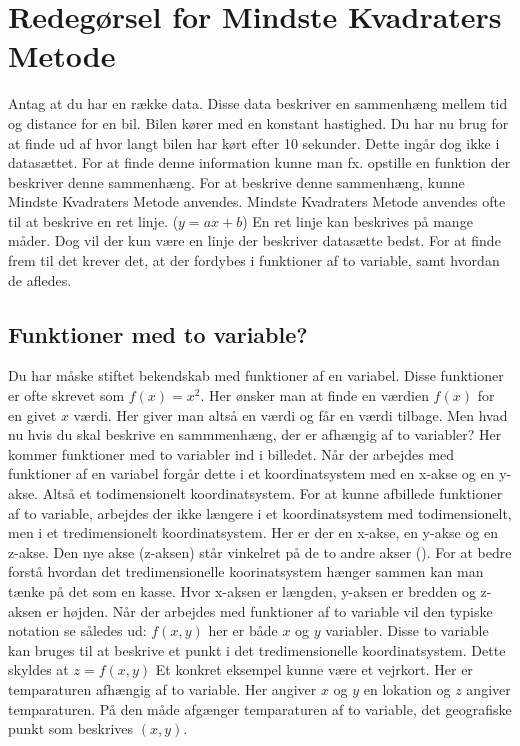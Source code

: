 \section{Redegørsel for Mindste Kvadraters Metode}\label{sec:redegorsel}
Antag at du har en række data. Disse data beskriver en sammenhæng mellem tid og distance for en bil. Bilen kører med en konstant hastighed. Du har nu brug for at finde ud af hvor langt bilen har kørt efter 10 sekunder. Dette ingår dog ikke i datasættet. For at finde denne information kunne man fx. opstille en funktion der beskriver denne sammenhæng. For at beskrive denne sammenhæng, kunne Mindste Kvadraters Metode anvendes. Mindste Kvadraters Metode anvendes ofte til at beskrive en ret linje. (\begin{math}y = ax + b\end{math}) En ret linje kan beskrives på mange måder. Dog vil der kun være en linje der beskriver datasætte bedst. For at finde frem til det krever det, at der fordybes i funktioner af to variable, samt hvordan de afledes.


\subsection{Funktioner med to variable?}\label{sec:FunktionerMedToVariable}
Du har måske stiftet bekendskab med funktioner af en variabel. Disse funktioner er ofte skrevet som \begin{math}f(x) = x^2\end{math}. Her ønsker man at finde en værdien $f(x)$ for en givet $x$ værdi. Her giver man altså en værdi og får en værdi tilbage. Men hvad nu hvis du skal beskrive en sammmenhæng, der er afhængig af to variabler? Her kommer funktioner med to variabler ind i billedet. Når der arbejdes med funktioner af en variabel forgår dette i et koordinatsystem med en x-akse og en y-akse. Altså et todimensionelt koordinatsystem. For at kunne afbillede funktioner af to variable, arbejdes der ikke længere i et koordinatsystem med todimensionelt, men i et tredimensionelt koordinatsystem. Her er der en x-akse, en y-akse og en z-akse. Den nye akse (z-aksen) står vinkelret på de to andre akser (\cite[246-248]{funktionrAfToVariable}). For at bedre forstå hvordan det tredimensionelle  koorinatsystem hænger sammen kan man tænke på det som en kasse. Hvor x-aksen er længden, y-aksen er bredden og z-aksen er højden. Når der arbejdes med funktioner af to variable vil den typiske notation se således ud: $f(x,y)$ her er både $x$ og $y$ variabler. Disse to variable kan bruges til at beskrive et punkt i det tredimensionelle koordinatsystem. Dette skyldes at $z = f(x,y)$ Et konkret eksempel kunne være et vejrkort. Her er temparaturen afhængig af to variable. Her angiver $x$ og $y$ en lokation og $z$ angiver temparaturen. På den måde afgænger temparaturen af to variable, det geografiske punkt som beskrives $(x,y)$.\\

